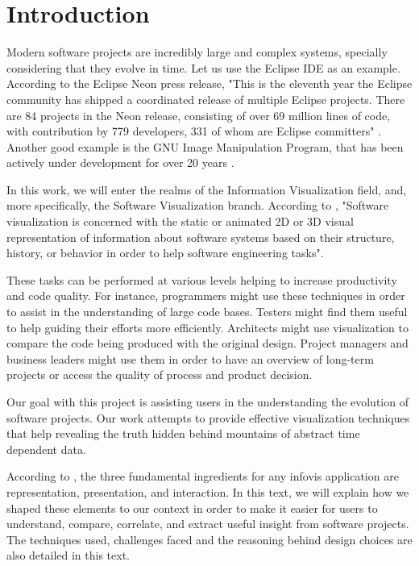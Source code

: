 \chapter{Introduction}
Modern software projects are incredibly large and complex systems, specially considering that they evolve in time. Let us use the Eclipse IDE as an example. According to the Eclipse Neon press release, "This is the eleventh year the Eclipse community has shipped a coordinated release of multiple Eclipse projects. There are 84 projects in the Neon release, consisting of over 69 million lines of code, with contribution by 779 developers, 331 of whom are Eclipse committers" \cite{ref:eclipse}.
Another good example is the GNU Image Manipulation Program, that has been actively under development for over 20 years \cite{ref:gimp}.

In this work, we will enter the realms of the Information Visualization field, and, more specifically, the Software Visualization branch. According to \citet{reg:diehl07}, "Software visualization is concerned with the static or animated 2D or 3D visual representation of information about software systems based on their structure, history, or behavior in order to help software engineering tasks".

These tasks can be performed at various levels helping to increase productivity and code quality. For instance, programmers might use these techniques in order to assist in the understanding of large code bases. Testers might find them useful to help guiding their efforts more efficiently. Architects might use visualization to compare the code being produced with the original design. Project managers and business leaders might use them in order to have an overview of long-term projects or access the quality of process and product decision.

Our goal with this project is assisting users in the understanding the evolution of software projects. Our work attempts to provide effective visualization techniques that help revealing the truth hidden behind mountains of abstract time dependent data.

According to \citet{ref:spence07}, the three fundamental ingredients for any infovis application are representation, presentation, and interaction. In this text, we will explain how we shaped these elements to our context in order to make it easier for users to understand, compare, correlate, and extract useful insight from software projects. The techniques used, challenges faced and the reasoning behind design choices are also detailed in this text.

